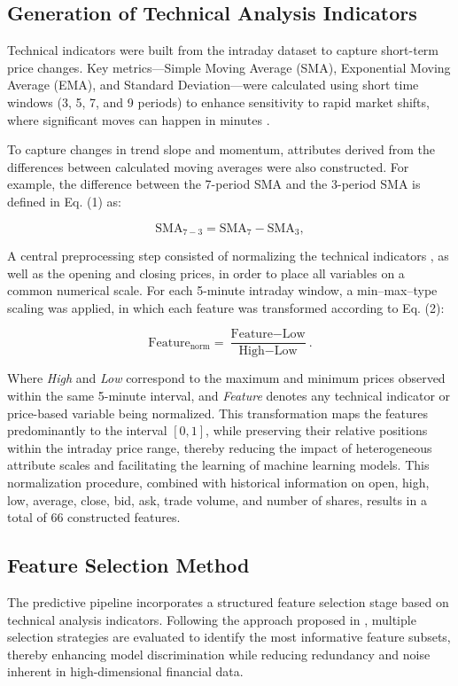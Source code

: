\subsection{Generation of Technical Analysis Indicators}
\label{sec:indicators}

Technical indicators were built from the intraday dataset to capture short-term price changes. Key metrics—Simple Moving Average (SMA), Exponential Moving Average (EMA), and Standard Deviation—were calculated using short time windows (3, 5, 7, and 9 periods) to enhance sensitivity to rapid market shifts, where significant moves can happen in minutes \cite{hunter1986exponentially}.

To capture changes in trend slope and momentum, attributes derived from the differences between calculated moving averages were also constructed. For example, the difference between the 7-period SMA and the 3-period SMA is defined in Eq. (1) as:

\begin{equation}
\text{SMA}_{7-3} = \text{SMA}_{7} - \text{SMA}_{3},
\end{equation}

A central preprocessing step consisted of normalizing the technical indicators \cite{singh2022feature}, as well as the opening and closing prices, in order to place all variables on a common numerical scale. For each 5-minute intraday window, a min–max–type scaling was applied, in which each feature was transformed according to Eq. (2):

\begin{equation}
\text{Feature}_{\text{norm}} = \frac{\text{Feature} - \text{Low}}{\text{High} - \text{Low}}.
\end{equation}

Where \textit{High} and \textit{Low} correspond to the maximum and minimum prices observed within the same 5-minute interval, and \textit{Feature} denotes any technical indicator or price-based variable being normalized. This transformation maps the features predominantly to the interval $[0,1]$, while preserving their relative positions within the intraday price range, thereby reducing the impact of heterogeneous attribute scales and facilitating the learning of machine learning models. This normalization procedure, combined with historical information on open, high, low, average, close, bid, ask, trade volume, and number of shares, results in a total of 66 constructed features.

\subsection{Feature Selection Method}
\label{sec:featureselection}
The predictive pipeline incorporates a structured feature selection stage based on technical analysis indicators. Following the approach proposed in \cite{souza2024dataset}, multiple selection strategies are evaluated to identify the most informative feature subsets, thereby enhancing model discrimination while reducing redundancy and noise inherent in high-dimensional financial data.

